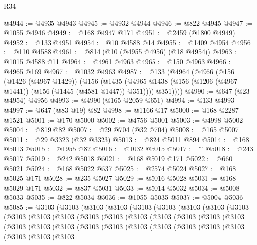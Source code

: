 \begin{lexlean}{R34}
\begin{coremodule}
@4944 := @4935 @4943
@4945 := @4932 @4944
@4946 := @822 @4945
@4947 := @1055 @4946
@4949 := @168 @4947 @171
@4951 := @2459 (@1800 @4949)
@4952 := @133 @4951
@4954 := @10 @4588 @14
@4955 := @1409 @4954
@4956 := @110 @4588
@4961 := @814 (@10 (@4955 @4956) (@18 @4954))
@4963 := @1015 @4588 @11
@4964 := @4961 @4963
@4965 := @150 @4963
@4966 := @4965 @169
@4967 := @1032 @4963
@4987 := @133
    (@4964
      (@4966
        (@156
          (@1426 (@4967 @1429))
          (@156
            (@1435 (@4965 @1438 (@156 (@1206 (@4967 @1441)) (@156 (@1445 (@4581 @1447)) @351))))
            @351))))
@4990 := @647 (@23 @4954) @4956
@4993 := @4990 (@165 @2059 @651)
@4994 := @133 @4993
@4997 := @647 (@83 @19) @82
@4998 := @1166 @17
@5000 := @168 @2287 @1521
@5001 := @170 @5000
@5002 := @4756 @5001
@5003 := @4998 @5002
@5004 := @819 @82
@5007 := @29 @704 (@32 @704)
@5008 := @165 @5007
@5011 := @29 @3323 (@32 @3323)
@5013 := @824 @5011 @894
@5014 := @168 @5013
@5015 := @1955 @82
@5016 := @1032 @5015
@5017 := "\n"
@5018 := @243 @5017
@5019 := @242 @5018
@5021 := @168 @5019 @171
@5022 := @660 @5021
@5024 := @168 @5022 @537
@5025 := @2574 @5024
@5027 := @168 @5025 @171
@5028 := @235 @5027
@5029 := @5016 @5028
@5031 := @168 @5029 @171
@5032 := @837 @5031
@5033 := @5014 @5032
@5034 := @5008 @5033
@5035 := @822 @5034
@5036 := @1055 @5035
@5037 := @5004 @5036
@5085 := @3103
    (@3103
      (@3103
        (@3103
          (@3103
            (@3103
              (@3103
                (@3103
                  (@3103
                    (@3103
                      (@3103
                        (@3103
                          (@3103
                            (@3103
                              (@3103
                                (@3103
                                  (@3103
                                    (@3103
                                      (@3103
                                        (@3103
                                          (@3103
                                            (@3103
                                              (@3103
                                                (@3103
                                                  (@3103
                                                    (@3103
                                                      (@3103
                                                        (@3103
                                                          (@3103
                                                            (@3103
                                                              (@3103
                                                                (@3103

\end{coremodule}
\end{lexlean}
